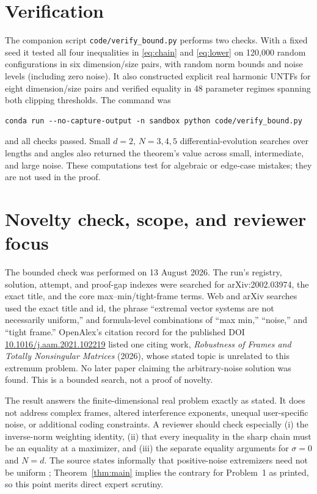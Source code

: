 \documentclass[11pt]{article}
\begin{document}
\section{Verification}

The companion script \texttt{code/verify\_bound.py} performs two checks.
With a fixed seed it tested all four inequalities in \eqref{eq:chain} and
\eqref{eq:lower} on 120,000 random configurations in six dimension/size
pairs, with random norm bounds and noise levels (including zero noise).  It
also constructed explicit real harmonic UNTFs for eight dimension/size pairs
and verified equality in 48 parameter regimes spanning both clipping
thresholds.  The command was
\begin{verbatim}
conda run --no-capture-output -n sandbox python code/verify_bound.py
\end{verbatim}
and all checks passed.  Small $d=2$, $N=3,4,5$ differential-evolution
searches over lengths and angles also returned the theorem's value across
small, intermediate, and large noise.  These computations test for algebraic
or edge-case mistakes; they are not used in the proof.

\section{Novelty check, scope, and reviewer focus}

The bounded check was performed on 13 August 2026.  The run's registry,
solution, attempt, and proof-gap indexes were searched for arXiv:2002.03974,
the exact title, and the core max--min/tight-frame terms.  Web and arXiv
searches used the exact title and id, the phrase ``extremal vector systems are
not necessarily uniform,'' and formula-level combinations of ``max min,''
``noise,'' and ``tight frame.''  OpenAlex's citation record for the published
DOI \href{https://doi.org/10.1016/j.aam.2021.102219}{10.1016/j.aam.2021.102219}
listed one citing work, \emph{Robustness of Frames and Totally Nonsingular
Matrices} (2026), whose stated topic is unrelated to this extremum problem.
No later paper claiming the arbitrary-noise solution was found.  This is a
bounded search, not a proof of novelty.

The result answers the finite-dimensional real problem exactly as stated.  It
does not address complex frames, altered interference exponents, unequal
user-specific noise, or additional coding constraints.  A reviewer should
check especially (i) the inverse-norm weighting identity, (ii) that every
inequality in the sharp chain must be an equality at a maximizer, and
(iii) the separate equality arguments for $\sigma=0$ and $N=d$.  The source
states informally that positive-noise extremizers need not be uniform
\cite[p.~4]{ABH}; Theorem~\ref{thm:main} implies the contrary for Problem~1 as
printed, so this point merits direct expert scrutiny.
\end{document}
